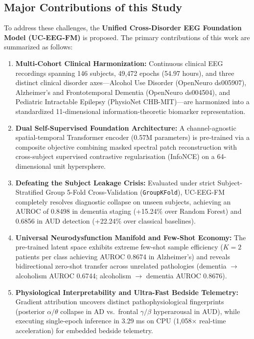 \documentclass[11pt,a4paper]{article}
\begin{document}
\subsection{Major Contributions of this Study}
To address these challenges, the \textbf{Unified Cross-Disorder EEG Foundation Model (UC-EEG-FM)} is proposed. The primary contributions of this work are summarized as follows:
\begin{enumerate}
    \item \textbf{Multi-Cohort Clinical Harmonization:} Continuous clinical EEG recordings spanning 146 subjects, 49,472 epochs (54.97 hours), and three distinct clinical disorder axes---Alcohol Use Disorder (OpenNeuro ds005907), Alzheimer's and Frontotemporal Dementia (OpenNeuro ds004504), and Pediatric Intractable Epilepsy (PhysioNet CHB-MIT)---are harmonized into a standardized 11-dimensional information-theoretic biomarker representation.
    \item \textbf{Dual Self-Supervised Foundation Architecture:} A channel-agnostic spatial-temporal Transformer encoder (0.57M parameters) is pre-trained via a composite objective combining masked spectral patch reconstruction with cross-subject supervised contrastive regularisation (InfoNCE) on a 64-dimensional unit hypersphere.
    \item \textbf{Defeating the Subject Leakage Crisis:} Evaluated under strict Subject-Stratified Group 5-Fold Cross-Validation (\texttt{GroupKFold}), UC-EEG-FM completely resolves diagnostic collapse on unseen subjects, achieving an AUROC of 0.8498 in dementia staging (+15.24\% over Random Forest) and 0.6856 in AUD detection (+22.24\% over classical baselines).
    \item \textbf{Universal Neurodysfunction Manifold and Few-Shot Economy:} The pre-trained latent space exhibits extreme few-shot sample efficiency ($K=2$ patients per class achieving AUROC 0.8674 in Alzheimer's) and reveals bidirectional zero-shot transfer across unrelated pathologies (dementia $\to$ alcoholism AUROC 0.6744; alcoholism $\to$ dementia AUROC 0.8676).
    \item \textbf{Physiological Interpretability and Ultra-Fast Bedside Telemetry:} Gradient attribution uncovers distinct pathophysiological fingerprints (posterior $\alpha/\theta$ collapse in AD vs.\ frontal $\gamma/\beta$ hyperarousal in AUD), while executing single-epoch inference in 3.29 ms on CPU (1,058$\times$ real-time acceleration) for embedded bedside telemetry.
\end{enumerate}
\end{document}
